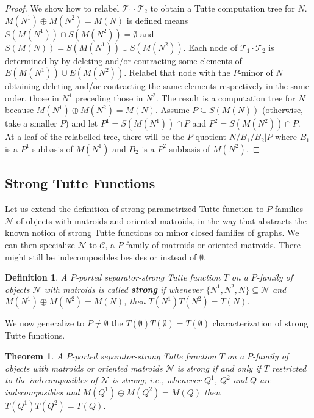 \documentclass[12pt,leqno]{amsart}
\newtheorem{thm}[lem]{Theorem}
\newtheorem{definition}[lem]{Definition}
\theoremstyle{remark}
\begin{document}
\begin{proof}

We show how to relabel $\mathcal{T}_1\cdot\mathcal{T}_2$ to obtain 
a Tutte computation tree for $N$.  $M(N^1)\oplus M(N^2)=M(N)$ is defined
means $S(M(N^1))\cap S(M(N^2))=\emptyset$ and 
$S(M(N))=S(M(N^1))\cup S(M(N^2))$.   Each node of 
$\mathcal{T}_1\cdot\mathcal{T}_2$ is determined by 
by deleting and/or contracting some elements of
$E(M(N^1))\cup E(M(N^2))$.  Relabel that node with the 
$P$-minor of $N$ obtaining deleting and/or contracting the
same elements respectively in the same order, those in $N^1$
preceding those in $N^2$.  The result is a computation tree for $N$
because $M(N^1)\oplus M(N^2)=M(N)$.  Assume $P\subseteq S(M(N))$
(otherwise, take a smaller $P$) and let $P^1=S(M(N^1))\cap P$
and $P^2=S(M(N^2))\cap P$.
At a leaf of the relabelled
tree, there will be the $P$-quotient $N/B_1/B_2|P$ where
$B_1$ is a $P^1$-subbasis of $M(N^1)$ and $B_2$ is a $P^2$-subbasis
of $M(N^2)$.  

\end{proof}

\subsection{Strong Tutte Functions}

Let us extend the definition of strong parametrized Tutte function
to $P$-families $\mathcal{N}$ of objects with matroids and oriented matroids,
in the way that abstracts the known notion of strong Tutte functions
on minor closed families of graphs\cite{Ellis-Monaghan-Traldi}.
We can then specialize 
$\mathcal{N}$ to $\mathcal{C}$, a $P$-family  of 
matroids or oriented matroids.
There might still be indecomposibles besides or instead of $\emptyset$.

\begin{definition}
A $P$-ported separator-strong Tutte function $T$ on a $P$-family of 
objects $\mathcal{N}$
with matroids is called \textbf{strong} if
whenever $\{N^1, N^2, N\}\subseteq\mathcal{N}$
and 
$M(N^1)\oplus M(N^2)=M(N)$, 
then $T(N^1)T(N^2)=T(N)$.
\end{definition}

We now generalize to $P\neq\emptyset$
the $T(\emptyset)T(\emptyset)=T(\emptyset)$ 
characterization of strong Tutte functions.

\begin{thm}
\label{StrongTheorem}
A $P$-ported separator-strong Tutte function $T$ on a $P$-family of 
objects 
with matroids or oriented matroids $\mathcal{N}$ 
is strong if and only if
$T$ restricted to the indecomposibles of 
$\mathcal{N}$ is strong; i.e.,
whenever $Q^1$, $Q^2$ and 
$Q$ are indecomposibles and $M(Q^1)\oplus M(Q^2)=M(Q)$ then
$T(Q^1)T(Q^2)=T(Q)$.
\end{thm}
\end{document}
